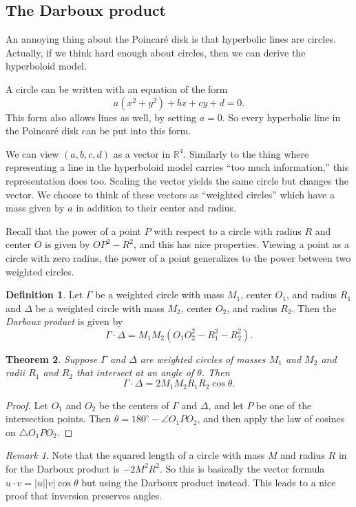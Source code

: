 \documentclass{article}
\newtheorem{thm}{Theorem}
\theoremstyle{definition}
\newtheorem{defn}[thm]{Definition}
\theoremstyle{remark}
\newtheorem*{rmk}{Remark}
\newenvironment{aside}{\renewcommand{\thesection}{(\textit{\arabic{section}})}\renewcommand{\thesubsection}{(\textit{\arabic{section}.\arabic{subsection}})}}{\renewcommand{\thesection}{\arabic{section}}\renewcommand{\thesubsection}{\arabic{section}.\arabic{subsection}}}
\begin{document}
\begin{aside}
\subsection{The Darboux product}
An annoying thing about the Poincar\'e disk is that hyperbolic lines are circles. Actually, if we think hard enough about circles, then we can derive the hyperboloid model.

A circle can be written with an equation of the form
\[a(x^2+y^2)+bx+cy+d=0.\]
This form also allows lines as well, by setting $a=0$. So every hyperbolic line in the Poincar\'e disk can be put into this form.

We can view $(a,b,c,d)$ as a vector in $\mathbb R^4$. Similarly to the thing where representing a line in the hyperboloid model carries ``too much information,'' this representation does too. Scaling the vector yields the same circle but changes the vector. We choose to think of these vectors as ``weighted circles'' which have a mass given by $a$ in addition to their center and radius.

Recall that the power of a point $P$ with respect to a circle with radius $R$ and center $O$ is given by $OP^2-R^2$, and this has nice properties. Viewing a point as a circle with zero radius, the power of a point generalizes to the power between two weighted circles.
\begin{defn}
    Let $\Gamma$ be a weighted circle with mass $M_1$, center $O_1$, and radius $R_1$ and $\Delta$ be a weighted circle with mass $M_2$, center $O_2$, and radius $R_2$. Then the \emph{Darboux product} is given by
    \[\Gamma\cdot\Delta=M_1M_2(O_1O_2^2-R_1^2-R_2^2).\]
\end{defn}
\begin{thm}
    Suppose $\Gamma$ and $\Delta$ are weighted circles of masses $M_1$ and $M_2$ and radii $R_1$ and $R_2$ that intersect at an angle of $\theta$. Then
    \[\Gamma\cdot\Delta=2M_1M_2R_1R_2\cos\theta.\]
\end{thm}
\begin{proof}
    Let $O_1$ and $O_2$ be the centers of $\Gamma$ and $\Delta$, and let $P$ be one of the intersection points. Then $\theta=180^\circ-\angle O_1PO_2$, and then apply the law of cosines on $\triangle O_1PO_2$.
\end{proof}

\begin{rmk}
    Note that the squared length of a circle with mass $M$ and radius $R$ in for the Darboux product is $-2M^2R^2$. So this is basically the vector formula $u\cdot v= |u| |v| \cos\theta$ but using the Darboux product instead. This leads to a nice proof that inversion preserves angles.
\end{rmk}


\end{aside}
\end{document}

